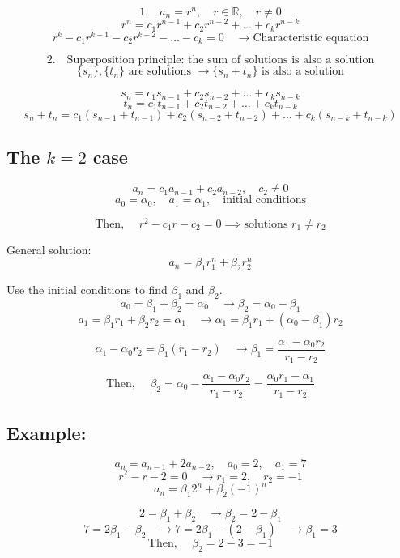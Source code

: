 \documentclass[11pt]{article}
\begin{document}
\[
1. \quad a_n = r^n, \quad r \in \mathbb{R}, \quad r \neq 0
\]
\[
r^n = c_1 r^{n-1} + c_2 r^{n-2} + \dots + c_k r^{n-k}
\]
\[
r^k - c_1 r^{k-1} - c_2 r^{k-2} - \dots - c_k = 0 \quad \rightarrow \text{Characteristic equation}
\]

\[
2. \quad \text{Superposition principle: the sum of solutions is also a solution} 
\]
\[
\{s_n\}, \{t_n\} \text{ are solutions } \rightarrow \{s_n + t_n\} \text{ is also a solution}
\]

\[
s_n = c_1 s_{n-1} + c_2 s_{n-2} + \dots + c_k s_{n-k}
\]
\[
t_n = c_1 t_{n-1} + c_2 t_{n-2} + \dots + c_k t_{n-k}
\]
\[
s_n + t_n = c_1 (s_{n-1} + t_{n-1}) + c_2 (s_{n-2} + t_{n-2}) + \dots + c_k (s_{n-k} + t_{n-k})
\]

\subsection{The $k = 2$ case}
\[
a_n = c_1 a_{n-1} + c_2 a_{n-2}, \quad c_2 \neq 0
\]
\[
a_0 = \alpha_0, \quad a_1 = \alpha_1, \quad \text{initial conditions}
\]

\[
\text{Then, } \quad r^2 - c_1 r - c_2 = 0
\implies \text{solutions } r_1 \neq r_2
\]

General solution:
\[
a_n = \beta_1 r_1^n + \beta_2 r_2^n
\]

Use the initial conditions to find $\beta_1$ and $\beta_2$.
\[
a_0 = \beta_1 + \beta_2 = \alpha_0 \quad \rightarrow \beta_2 = \alpha_0 - \beta_1
\]
\[
a_1 = \beta_1 r_1 + \beta_2 r_2 = \alpha_1 \quad \rightarrow \alpha_1 = \beta_1 r_1 + (\alpha_0 - \beta_1) r_2
\]

\[
\alpha_1 - \alpha_0 r_2 = \beta_1 (r_1 - r_2) \quad \rightarrow \beta_1 = \frac{\alpha_1 - \alpha_0 r_2}{r_1 - r_2}
\]

\[
\text{Then, } \quad \beta_2 = \alpha_0 - \frac{\alpha_1 - \alpha_0 r_2}{r_1 - r_2} = \frac{\alpha_0 r_1 - \alpha_1}{r_1 - r_2}
\]

\subsection*{Example:}
\[
a_n = a_{n-1} + 2a_{n-2}, \quad a_0 = 2, \quad a_1 = 7
\]
\[
r^2 - r - 2 = 0 \quad \rightarrow r_1 = 2, \quad r_2 = -1
\]
\[
a_n = \beta_1 2^n + \beta_2 (-1)^n
\]

\[
2 = \beta_1 + \beta_2 \quad \rightarrow \beta_2 = 2 - \beta_1
\]
\[
7 = 2 \beta_1 - \beta_2 \quad \rightarrow 7 = 2 \beta_1 - (2 - \beta_1) \quad \rightarrow \beta_1 = 3
\]
\[
\text{Then, } \quad \beta_2 = 2 - 3 = -1
\]
\end{document}
